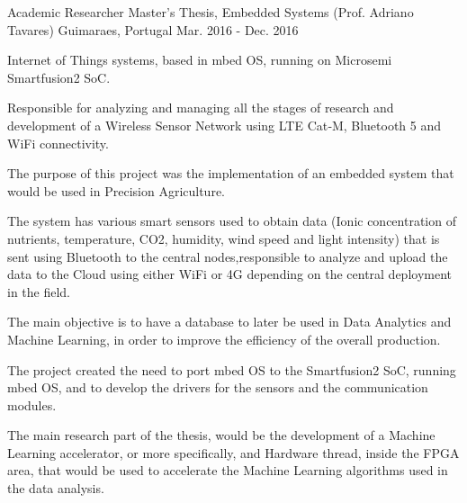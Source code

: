 \begin{cventries}
  \cventry
    {Academic Researcher} %
    {Master’s Thesis, Embedded Systems (Prof. Adriano Tavares)} %
    {Guimaraes, Portugal} %
    {Mar. 2016 - Dec. 2016} %
    {
      \begin{cvitems} %
        \item {Internet of Things systems, based in mbed OS, running on Microsemi Smartfusion2 SoC.}
        \item {Responsible for analyzing and managing all the stages of research and development of a Wireless Sensor Network using LTE Cat‑M, Bluetooth 5 and WiFi connectivity.}
        \item {The purpose of this project was the implementation of an embedded system that would be used in Precision Agriculture.}
        \item {The system has various smart sensors used to obtain data (Ionic concentration of nutrients, temperature, CO2, humidity, wind speed and light intensity) that is sent using Bluetooth to the central nodes,responsible to analyze and upload the data to the Cloud using either WiFi or 4G depending on the central deployment in the field.}
        \item {The main objective is to have a database to later be used in Data Analytics and Machine Learning, in order to improve the efficiency of the overall production.}
        \item {The project created the need to port mbed OS to the Smartfusion2 SoC, running mbed OS, and to develop the drivers for the sensors and the communication modules.}
        \item {The main research part of the thesis, would be the development of a Machine Learning accelerator, or more specifically, and Hardware thread, inside the FPGA area, that would be used to accelerate the Machine Learning algorithms used in the data analysis.}
      \end{cvitems}
    }


\end{cventries}
